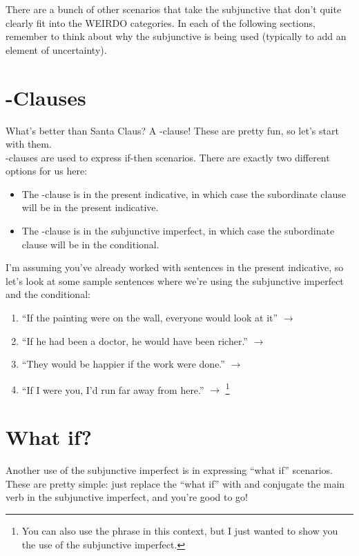 \label{sec:other}

There are a bunch of other scenarios that take the subjunctive that don't quite clearly fit into the WEIRDO categories. In each of the following sections, remember to think about why the subjunctive is being used (typically to add an element of uncertainty).

\section{-Clauses}

What's better than Santa Claus? A -clause! These are pretty fun, so let's start with them. \\

-clauses are used to express if-then scenarios. There are exactly two different options for us here:
\begin{itemize}[noitemsep]
	\item The -clause is in the present indicative, in which case the subordinate clause will be in the present indicative.
	\item The -clause is in the subjunctive imperfect, in which case the subordinate clause will be in the conditional. 
\end{itemize}

I'm assuming you've already worked with sentences in the present indicative, so let's look at some sample sentences where we're using the subjunctive imperfect and the conditional:
\begin{enumerate}[noitemsep]
	\item ``If the painting were on the wall, everyone would look at it'' $\rightarrow$ 
	\item ``If he had been a doctor, he would have been richer.'' $\rightarrow$ 
	\item ``They would be happier if the work were done.'' $\rightarrow$ 
	\item ``If I were you, I'd run far away from here.'' $\rightarrow$ \footnote{You can also use the phrase  in this context, but I just wanted to show you the use of the subjunctive imperfect.}
\end{enumerate}


\section{What if?}
Another use of the subjunctive imperfect is in expressing ``what if'' scenarios. These are pretty simple: just replace the ``what if'' with  and conjugate the main verb in the subjunctive imperfect, and you're good to go!\\

